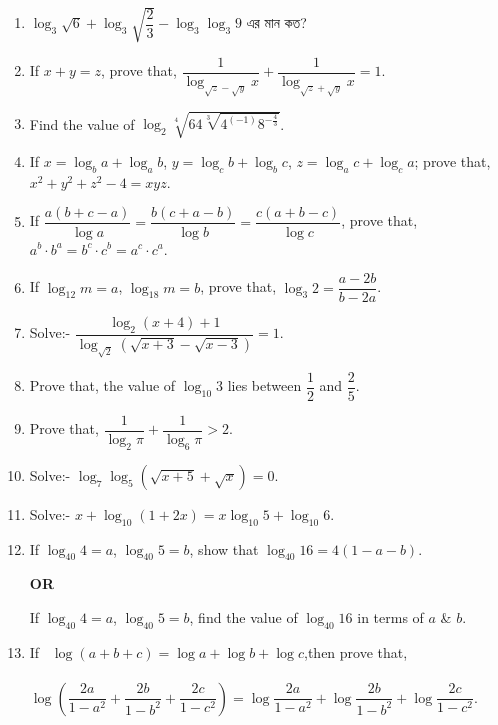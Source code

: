 \documentclass[11pt, a4paper]{article}
\begin{document}
\begin{enumerate}
     	\item $ \log_3 \sqrt{6} + \log_3 \sqrt{\dfrac{2}{3}} - \log_3 \log_3 9 $ \textbengali{এর মান কত?}
     	
     	\item If $ x + y = z $, prove that, $ \dfrac{1}{\log_{\sqrt{z} - \sqrt{y}} x} + \dfrac{1}{\log_{\sqrt{z} + \sqrt{y}} x} = 1 $.
     	
     	\item Find the value of $ \log_2 \sqrt[4]{64\sqrt[3]{4^{(-1)} 8^{-\frac{4}{3}}}} $.
     	
     	\item If $ x = \log_b a + \log_a b $, $ y = \log_c b + \log_b c $, $ z = \log_a c + \log_c a $; prove that, $ x^2 + y^2 + z^2 - 4 = xyz $.
     	
     	\item If $ \dfrac{a(b+c-a)}{\log a} = \dfrac{b(c+a-b)}{\log b} = \dfrac{c(a+b-c)}{\log c} $, prove that, $ a^b \cdot b^a = b^c \cdot c^b = a^c \cdot c^a $.
     	
     	\item If $ \log_{12} m = a $, $ \log_{18} m = b $, prove that, $ \log_3 2 = \dfrac{a-2b}{b-2a} $.
     	
     	\item Solve:- $ \dfrac{\log_2 (x+4) + 1}{\log_{\sqrt{2}} (\sqrt{x+3} - \sqrt{x-3})} = 1 $.
  
	\item Prove that, the value of $\log_{10} 3$ lies between $ \dfrac{1}{2} $ and $ \dfrac{2}{5} $.
	
	\item Prove that, $ \dfrac{1}{\log_2 \pi} + \dfrac{1}{\log_6 \pi} > 2 $.
	
	\item Solve:- $ \log_7 \log_5 ( \sqrt{x+5} + \sqrt{x} ) = 0 $.
	
	\item Solve:- $ x + \log_{10} ( 1 + 2x ) = x\log_{10} 5 + \log_{10} 6 $.
	
	\item If $ \log_{40} 4 = a $, $ \log_{40} 5 = b $, show that $ \log_{40} 16 = 4(1-a-b) $.
	\begin{center}
	\textbf{OR} 
	\end{center}
	If $ \log_{40} 4 = a $, $ \log_{40} 5 = b $, find the value of $ \log_{40} 16 $ in terms of $a$ \& $b$.
	
	\item If \,  $ \log (a+b+c) = \log a + \log b + \log c $,then prove that,\\ \\ $ \log \left( \dfrac{2a}{1-a^2} + \dfrac{2b}{1-b^2} + \dfrac{2c}{1-c^2} \right) = \log \dfrac{2a}{1-a^2} + \log \dfrac{2b}{1-b^2} + \log \dfrac{2c}{1-c^2} $.
	

\end{enumerate}
\end{document}
